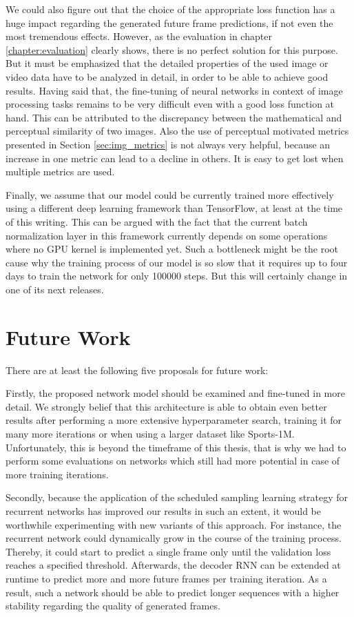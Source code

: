 We could also figure out that the choice of the appropriate loss function has a huge impact regarding the generated future frame predictions, if not even the most tremendous effects. However, as the evaluation in chapter \ref{chapter:evaluation} clearly shows, there is no perfect solution for this purpose. But it must be emphasized that the detailed properties of the used image or video data have to be analyzed in detail, in order to be able to achieve good results. Having said that, the fine-tuning of neural networks in context of image processing tasks remains to be very difficult even with a good loss function at hand. This can be attributed to the discrepancy between the mathematical and perceptual similarity of two images. Also the use of perceptual motivated metrics presented in Section \ref{sec:img_metrics} is not always very helpful, because an increase in one metric can lead to a decline in others. It is easy to get lost when multiple metrics are used.

Finally, we assume that our model could be currently trained more effectively using a different deep learning framework than TensorFlow, at least at the time of this writing. This can be argued with the fact that the current batch normalization layer in this framework currently depends on some operations where no GPU kernel is implemented yet. Such a bottleneck might be the root cause why the training process of our model is so slow that it requires up to four days to train the network for only \num{100000} steps. But this will certainly change in one of its next releases.


\section{Future Work}

There are at least the following five proposals for future work:

Firstly, the proposed network model should be examined and fine-tuned in more detail. We strongly belief that this architecture is able to obtain even better results after performing a more extensive hyperparameter search, training it for many more iterations or when using a larger dataset like Sports-1M. Unfortunately, this is beyond the timeframe of this thesis, that is why we had to perform some evaluations on networks which still had more potential in case of more training iterations.

Secondly, because the application of the scheduled sampling learning strategy for recurrent networks has improved our results in such an extent, it would be worthwhile experimenting with new variants of this approach. For instance, the recurrent network could dynamically grow in the course of the training process. Thereby, it could start to predict a single frame only until the validation loss reaches a specified threshold. Afterwards, the decoder RNN can be extended at runtime to predict more and more future frames per training iteration. As a result, such a network should be able to predict longer sequences with a higher stability regarding the quality of generated frames. 

